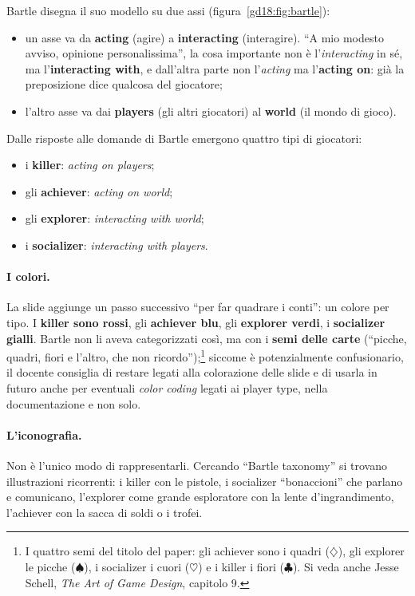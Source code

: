 Bartle disegna il suo modello su due assi (figura~\ref{gd18:fig:bartle}):
\begin{itemize}
  \item un asse va da \textbf{acting} (agire) a \textbf{interacting} (interagire).
        ``A mio modesto avviso, opinione personalissima'', la cosa importante non è
        l'\emph{interacting} in sé, ma l'\textbf{interacting with}, e dall'altra
        parte non l'\emph{acting} ma l'\textbf{acting on}: già la preposizione dice
        qualcosa del giocatore;
  \item l'altro asse va dai \textbf{players} (gli altri giocatori) al
        \textbf{world} (il mondo di gioco).
\end{itemize}
Dalle risposte alle domande di Bartle emergono quattro tipi di giocatori:
\begin{itemize}
  \item i \textbf{killer}: \emph{acting on players};
  \item gli \textbf{achiever}: \emph{acting on world};
  \item gli \textbf{explorer}: \emph{interacting with world};
  \item i \textbf{socializer}: \emph{interacting with players}.
\end{itemize}

\paragraph{I colori.} La slide aggiunge un passo successivo ``per far quadrare i
conti'': un colore per tipo. I \textbf{killer sono rossi}, gli \textbf{achiever
blu}, gli \textbf{explorer verdi}, i \textbf{socializer gialli}. Bartle non li aveva
categorizzati così, ma con i \textbf{semi delle carte} (``picche, quadri, fiori e
l'altro, che non ricordo'');\footnote{I quattro semi del titolo del paper: gli
achiever sono i quadri ($\diamondsuit$), gli explorer le picche ($\spadesuit$), i
socializer i cuori ($\heartsuit$) e i killer i fiori ($\clubsuit$). Si veda anche
Jesse Schell, \emph{The Art of Game Design}, capitolo 9.} siccome è potenzialmente
confusionario, il docente consiglia di restare legati alla colorazione delle slide e
di usarla in futuro anche per eventuali \emph{color coding} legati ai player type,
nella documentazione e non solo.

\paragraph{L'iconografia.} Non è l'unico modo di rappresentarli. Cercando
``Bartle taxonomy'' si trovano illustrazioni ricorrenti: i killer con le pistole, i
socializer ``bonaccioni'' che parlano e comunicano, l'explorer come grande
esploratore con la lente d'ingrandimento, l'achiever con la sacca di soldi o i
trofei.

